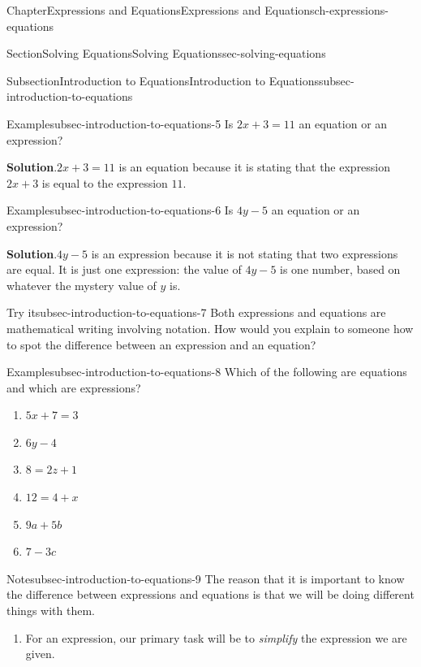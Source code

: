 \documentclass[twoside,11pt,]{book}
\newcommand{\blocktitlefont}{\relax}
\numberwithin{equation}{chapter}
\begin{document}
\begin{chapterptx}{Chapter}{Expressions and Equations}{}{Expressions and Equations}{}{}{ch-expressions-equations}
\begin{sectionptx}{Section}{Solving Equations}{}{Solving Equations}{}{}{sec-solving-equations}
\begin{subsectionptx}{Subsection}{Introduction to Equations}{}{Introduction to Equations}{}{}{subsec-introduction-to-equations}
\begin{example}{Example}{}{subsec-introduction-to-equations-5}%
Is \(2x + 3 = 11\) an equation or an expression?%
\par\smallskip%
\noindent\textbf{\blocktitlefont Solution}.\hypertarget{subsec-introduction-to-equations-5-2}{}\quad{}\(2x + 3 = 11\)  is an equation because it is stating that the expression \(2x + 3\) is equal to the expression \(11\).%
\end{example}
\begin{example}{Example}{}{subsec-introduction-to-equations-6}%
Is \(4y - 5\) an equation or an expression?%
\par\smallskip%
\noindent\textbf{\blocktitlefont Solution}.\hypertarget{subsec-introduction-to-equations-6-2}{}\quad{}\(4y - 5\) is an expression because it is not stating that two expressions are equal. It is just one expression: the value of \(4y-5\) is one number, based on whatever the mystery value of \(y\) is.%
\end{example}
\begin{inlineexercise}{Try it}{}{subsec-introduction-to-equations-7}%
Both expressions and equations are mathematical writing involving notation. How would you explain to someone how to spot the difference between an expression and an equation?%
\end{inlineexercise}%
\begin{example}{Example}{}{subsec-introduction-to-equations-8}%
Which of the following are equations and which are expressions?%
\begin{enumerate}
\item{}\(\displaystyle 5x + 7 = 3\)%
\item{}\(\displaystyle 6y - 4\)%
\item{}\(\displaystyle 8 = 2z + 1\)%
\item{}\(\displaystyle 12 = 4 + x\)%
\item{}\(\displaystyle 9a + 5b\)%
\item{}\(\displaystyle 7 - 3c\)%
\end{enumerate}
%
\end{example}
\begin{note}{Note}{}{subsec-introduction-to-equations-9}%
The reason that it is important to know the difference between expressions and equations is that we will be doing different things with them.%
\begin{enumerate}
\item{}For an expression, our primary task will be to \emph{simplify} the expression we are given.%

\end{enumerate}
\end{note}
\end{subsectionptx}
\end{sectionptx}
\end{chapterptx}
\end{document}
